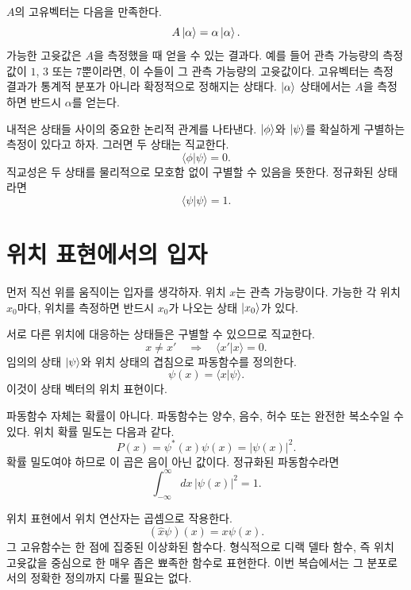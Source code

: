 \(A\)의 고유벡터는 다음을 만족한다.
\begin{equation}
A\left\lvert\alpha\right\rangle=\alpha\left\lvert\alpha\right\rangle.
\end{equation}
가능한 고윳값은 \(A\)을 측정했을 때 얻을 수 있는 결과다. 예를 들어 관측 가능량의 측정값이 \(1\), \(3\) 또는 \(7\)뿐이라면, 이 수들이 그 관측 가능량의 고윳값이다. 고유벡터는 측정 결과가 통계적 분포가 아니라 확정적으로 정해지는 상태다. \(\left\lvert\alpha\right\rangle\) 상태에서는 \(A\)을 측정하면 반드시 \(\alpha\)를 얻는다.

내적은 상태들 사이의 중요한 논리적 관계를 나타낸다. \(\left\lvert\phi\right\rangle\)와 \(\left\lvert\psi\right\rangle\)를 확실하게 구별하는 측정이 있다고 하자. 그러면 두 상태는 직교한다.
\begin{equation}
\langle\phi|\psi\rangle=0.
\end{equation}
직교성은 두 상태를 물리적으로 모호함 없이 구별할 수 있음을 뜻한다. 정규화된 상태라면
\begin{equation}
\langle\psi|\psi\rangle=1.
\end{equation}

\section{위치 표현에서의 입자}

먼저 직선 위를 움직이는 입자를 생각하자. 위치 \(x\)는 관측 가능량이다. 가능한 각 위치 \(x_0\)마다, 위치를 측정하면 반드시 \(x_0\)가 나오는 상태 \(\left\lvert x_0\right\rangle\)가 있다.

서로 다른 위치에 대응하는 상태들은 구별할 수 있으므로 직교한다.
\begin{equation}
x\neq x'
\quad\Longrightarrow\quad
\langle x'|x\rangle=0.
\end{equation}
임의의 상태 \(\left\lvert\psi\right\rangle\)와 위치 상태의 겹침으로 파동함수를 정의한다.
\begin{equation}
\psi(x)=\langle x|\psi\rangle.
\end{equation}
이것이 상태 벡터의 위치 표현이다.

파동함수 자체는 확률이 아니다. 파동함수는 양수, 음수, 허수 또는 완전한 복소수일 수 있다. 위치 확률 밀도는 다음과 같다.
\begin{equation}
P(x)=\psi^*(x)\psi(x)=|\psi(x)|^2.
\end{equation}
확률 밀도여야 하므로 이 곱은 음이 아닌 값이다. 정규화된 파동함수라면
\begin{equation}
\int_{-\infty}^{\infty}dx\,|\psi(x)|^2=1.
\end{equation}

위치 표현에서 위치 연산자는 곱셈으로 작용한다.
\begin{equation}
(\hat x\psi)(x)=x\psi(x).
\end{equation}
그 고유함수는 한 점에 집중된 이상화된 함수다. 형식적으로 디랙 델타 함수, 즉 위치 고윳값을 중심으로 한 매우 좁은 뾰족한 함수로 표현한다. 이번 복습에서는 그 분포로서의 정확한 정의까지 다룰 필요는 없다.

